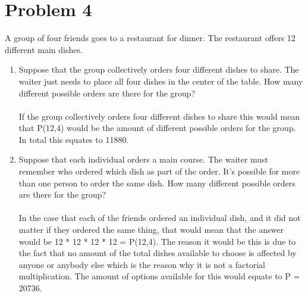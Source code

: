 \section*{Problem 4}
A group of four friends goes to a restaurant for dinner. The restaurant offers 12 different main dishes.\\
    \begin{enumerate}[label=(\roman*)]
    \item Suppose that the group collectively orders four different dishes to share. The waiter just needs to place all four dishes in the center of the table. How many different possible orders are there for the group?\\\\
If the group collectively orders four different dishes to share this would mean that P(12,4) would be the amount of different possible orders for the group. In total this equates to 11880.
    \item Suppose that each individual orders a main course. The waiter must remember who ordered which dish as part of the order. It's possible for more than one person to order the same dish. How many different possible orders are there for the group?\\\\
In the case that each of the friends ordered an individual dish, and it did not matter if they ordered the same thing, that would mean that the answer would be 12 * 12 * 12 * 12 = P(12,4). The reason it would be this is due to the fact that no amount of the total dishes available to choose is affected by anyone or anybody else which is the reason why it is not a factorial multiplication. The amount of options available for this would equate to P = 20736.
\\\\

    \end{enumerate}


